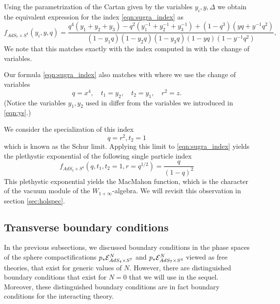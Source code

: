\documentclass[../main.tex]{subfiles}
\begin{document}
Using the parametrization of the Cartan given by the variables $y_i, y,\Delta$ we obtain the equivalent expression for the index \eqref{eqn:sugra_index} as 
\begin{equation}
\label{eqn:Kim_sugra}
f_{AdS_7\times S^4} (y_i, y, q) = \frac{q^4(y_1+y_2+y_3)-q^2(y_1^{-1} + y_2^{-1} + y_3^{-1})+(1-q^3)(yq + y^{-1} q^2)}{(1-y_1 q)(1-y_2 q)(1-y_3 q)(1-yq)(1-y^{-1} q^2)},
\end{equation}
We note that this matches exactly with the index computed in \cite[Eq. (3.23)]{Kim:2013nva} with the change of variables.

Our formula \eqref{eqn:sugra_index} also matches with \cite[Eq. (3.24)]{Bhattacharya:2008zy} where we use the change of variables
\begin{equation}
q = x^4, \quad t_1 = y_2, \quad t_2 = y_1, \quad r^2 = z .
\end{equation}
(Notice the variables $y_1,y_2$ used in \cite{Bhattacharya:2008zy} differ from the variables we introduced in \eqref{eqn:ys}.)

\parsec \label{eqn:winfty}
We consider the specialization of this index 
\begin{equation}
q=r^2, t_2=1 
\end{equation}
which is known as the Schur limit.
Applying this limit to \eqref{eqn:sugra_index} yields the plethystic exponential of the following single particle index
\[
f_{AdS_7\times S^4}(q, t_1, t_2=1, r = q^{1/2}) = \frac{q}{(1-q)^2} 
\]
This plethystic exponential yields the MacMahon function, which is the character of the vacuum module of the $W_{1+\infty}$-algebra. We will revisit this observation in section \ref{sec:holspec}.

\subsection{Transverse boundary conditions}\label{sec:transversebc}
In the previous subsections, we discussed boundary conditions in the phase spaces of the sphere compactifications $p_* \mathcal{E}^N_{AdS_4\times S^7}$ and $p_* \mathcal{E}^N_{AdS_7\times S^4}$ viewed as free theories, that exist for generic values of $N$. However, there are distinguished boundary conditions that exist for $N = 0$ that we will use in the sequel. Moreover, these distinguished boundary conditions are in fact boundary conditions for the interacting theory. 
\end{document}
